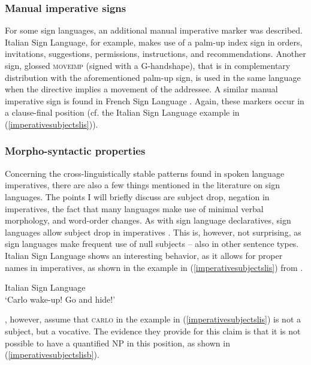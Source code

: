 \subsubsection{Manual imperative signs}
For some sign languages, an additional manual imperative marker was described. Italian Sign Language, for example, makes use of a palm-up index sign in orders, invitations, suggestions, permissions, instructions, and recommendations. Another sign, glossed \textsc{moveimp} (signed with a G-handshape), that is in complementary distribution with the aforementioned palm-up sign, is used in the same language when the directive implies a movement of the addressee. A similar manual imperative sign is found in French Sign Language  \citep{donati2017searching}. Again, these markers occur in a clause-final position (cf. the Italian Sign Language example in (\ref{imperativesubjectslis})).

\subsubsection{Morpho-syntactic properties}
Concerning the cross-linguistically stable patterns found in spoken language imperatives, there are also a few things mentioned in the literature on sign languages. The points I will briefly discuss are subject drop, negation in imperatives, the fact that many languages make use of minimal verbal morphology, and word-order changes. As with sign language declaratives, sign languages allow subject drop in imperatives \citep{ozsoy2014commands, donati2017searching}. This is, however, not surprising, as sign languages make frequent use of null subjects -- also in other sentence types. Italian Sign Language shows an interesting behavior, as it allows for proper names in imperatives, as shown in the example in (\ref{imperativesubjectslis}) from \citet[134]{donati2017searching}.

\begin{exe}
\ex Italian Sign Language \\ 
\glt `Carlo wake-up! Go and hide!' \label{imperativesubjectslis}
\end{exe}

\noindent \citet[134]{donati2017searching}, however, assume that \textsc{carlo} in the example in (\ref{imperativesubjectslis}) is not a subject, but a vocative. The evidence they provide for this claim is that it is not possible to have a quantified NP in this position, as shown in (\ref{imperativesubjectslisb}).

